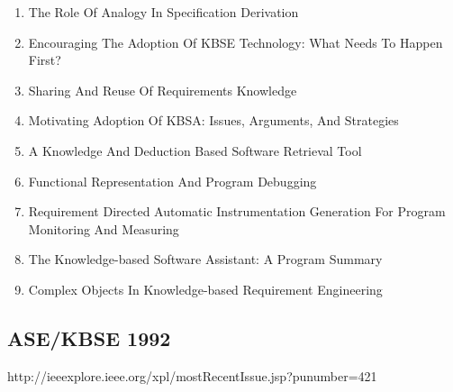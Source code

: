 \begin{enumerate}[itemsep=-1ex]
  \item The Role Of Analogy In Specification Derivation
  \item Encouraging The Adoption Of KBSE Technology: What Needs To Happen First?
  \item Sharing And Reuse Of Requirements Knowledge
  \item Motivating Adoption Of KBSA: Issues, Arguments, And Strategies
  \item A Knowledge And Deduction Based Software Retrieval Tool
  \item Functional Representation And Program Debugging
  \item Requirement Directed Automatic Instrumentation Generation For Program Monitoring And Measuring
  \item The Knowledge-based Software Assistant: A Program Summary
  \item Complex Objects In Knowledge-based Requirement Engineering
\end{enumerate}

\subsection{ASE/KBSE 1992}

http://ieeexplore.ieee.org/xpl/mostRecentIssue.jsp?punumber=421

